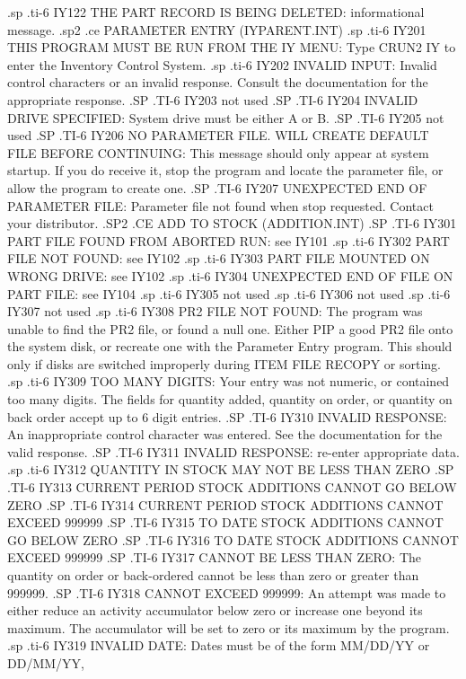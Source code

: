 .sp
.ti-6
IY122 THE PART RECORD IS BEING DELETED: informational message.
.sp2
.ce
PARAMETER ENTRY (IYPARENT.INT)
.sp
.ti-6
IY201 THIS PROGRAM MUST BE RUN FROM THE IY MENU: Type CRUN2 IY to enter the
Inventory Control System.
.sp
.ti-6
IY202 INVALID INPUT: Invalid control characters or an invalid response.
Consult the documentation for the appropriate response.
.SP
.TI-6
IY203 not used
.SP
.TI-6
IY204 INVALID DRIVE SPECIFIED: System drive must be either A or B.
.SP
.TI-6
IY205 not used
.SP
.TI-6
IY206 NO PARAMETER FILE. WILL CREATE DEFAULT FILE BEFORE CONTINUING:
This message should only appear at system startup.  If you do receive it,
stop the program and locate the parameter file, or allow the program to
create one.
.SP
.TI-6
IY207 UNEXPECTED END OF PARAMETER FILE: Parameter file not found when stop
requested. Contact your distributor.
.SP2
.CE
ADD TO STOCK (ADDITION.INT)
.SP
.TI-6
IY301 PART FILE FOUND FROM ABORTED RUN: see IY101
.sp
.ti-6
IY302 PART FILE NOT FOUND: see IY102
.sp
.ti-6
IY303 PART FILE MOUNTED ON WRONG DRIVE: see IY102
.sp
.ti-6
IY304 UNEXPECTED END OF FILE ON PART FILE: see IY104
.sp
.ti-6
IY305 not used
.sp
.ti-6
IY306 not used
.sp
.ti-6
IY307 not used
.sp
.ti-6
IY308 PR2 FILE NOT FOUND: The program was unable to find the PR2 file, or
found a null one.  Either PIP a good PR2 file onto the system disk, or
recreate one with the Parameter Entry program. This should only if disks are
switched improperly during ITEM FILE RECOPY or sorting.
.sp
.ti-6
IY309 TOO MANY DIGITS: Your entry was not numeric, or contained too many
digits.  The fields for quantity added, quantity on order, or quantity on
back order accept up to 6 digit entries.
.SP
.TI-6
IY310 INVALID RESPONSE: An inappropriate control character was entered.
See the documentation for the valid response.
.SP
.TI-6
IY311 INVALID RESPONSE: re-enter appropriate data.
.sp
.ti-6
IY312 QUANTITY IN STOCK MAY NOT BE LESS THAN ZERO
.SP
.TI-6
IY313 CURRENT PERIOD STOCK ADDITIONS CANNOT GO BELOW ZERO
.SP
.TI-6
IY314 CURRENT PERIOD STOCK ADDITIONS CANNOT EXCEED 999999
.SP
.TI-6
IY315 TO DATE STOCK ADDITIONS CANNOT GO BELOW ZERO
.SP
.TI-6
IY316 TO DATE STOCK ADDITIONS CANNOT EXCEED 999999
.SP
.TI-6
IY317 CANNOT BE LESS THAN ZERO: The quantity on order or back-ordered cannot
be less than zero or greater than 999999.
.SP
.TI-6
IY318 CANNOT EXCEED 999999: An attempt was made to either reduce an activity
accumulator below zero or increase one beyond its maximum.  The
accumulator will be set to zero or its maximum by the program.
.sp
.ti-6
IY319 INVALID DATE: Dates must be of the form MM/DD/YY or DD/MM/YY,
